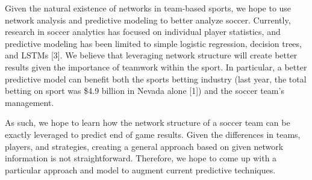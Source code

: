 Given the natural existence of networks in team-based sports, we hope to use network analysis and predictive modeling to better analyze soccer. Currently, research in soccer analytics has focused on individual player statistics, and predictive modeling has been limited to simple logistic regression, decision trees, and LSTMs [3]. We believe that leveraging network structure will create better results given the importance of teamwork within the sport. In particular, a better predictive model can benefit both the sports betting industry (last year, the total betting on sport was \$4.9 billion in Nevada alone [1]) and the soccer team's management.  

As such, we hope to learn how the network structure of a soccer team can be exactly leveraged to predict end of game results. Given the differences in teams, players, and strategies, creating a general approach based on given network information is not straightforward. Therefore, we hope to come up with a particular approach and model to augment current predictive techniques. 




